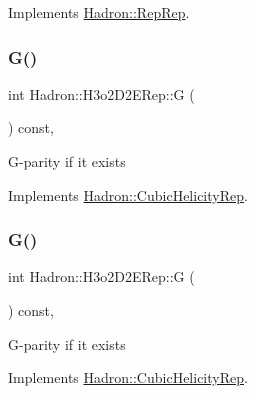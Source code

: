Implements \mbox{\hyperlink{structHadron_1_1RepRep_a92c8802e5ed7afd7da43ccfd5b7cd92b}{Hadron\+::\+Rep\+Rep}}.

\mbox{\label{structHadron_1_1H3o2D2ERep_aaa942303f4efab9a27088a542e7ba809}} 
\subsubsection{\texorpdfstring{G()}{G()}\hspace{0.1cm}{\footnotesize\ttfamily [1/3]}}
{\footnotesize\ttfamily int Hadron\+::\+H3o2\+D2\+E\+Rep\+::G (\begin{DoxyParamCaption}{ }\end{DoxyParamCaption}) const\hspace{0.3cm}{\ttfamily [inline]}, {\ttfamily [virtual]}}

G-\/parity if it exists 

Implements \mbox{\hyperlink{structHadron_1_1CubicHelicityRep_a50689f42be1e6170aa8cf6ad0597018b}{Hadron\+::\+Cubic\+Helicity\+Rep}}.

\mbox{\label{structHadron_1_1H3o2D2ERep_aaa942303f4efab9a27088a542e7ba809}} 
\subsubsection{\texorpdfstring{G()}{G()}\hspace{0.1cm}{\footnotesize\ttfamily [2/3]}}
{\footnotesize\ttfamily int Hadron\+::\+H3o2\+D2\+E\+Rep\+::G (\begin{DoxyParamCaption}{ }\end{DoxyParamCaption}) const\hspace{0.3cm}{\ttfamily [inline]}, {\ttfamily [virtual]}}

G-\/parity if it exists 

Implements \mbox{\hyperlink{structHadron_1_1CubicHelicityRep_a50689f42be1e6170aa8cf6ad0597018b}{Hadron\+::\+Cubic\+Helicity\+Rep}}.

\mbox{\label{structHadron_1_1H3o2D2ERep_aaa942303f4efab9a27088a542e7ba809}} 
